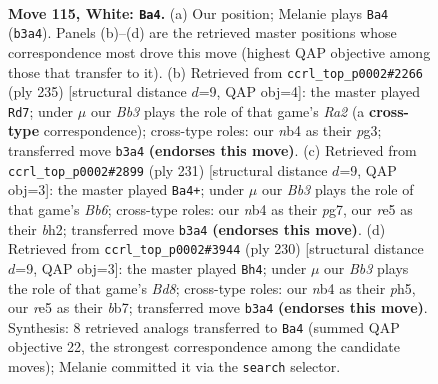 \documentclass[11pt]{article}
\begin{document}
\clearpage

\begin{figure}[p]\centering
\begin{subfigure}{0.46\textwidth}\centering
\resizebox{\linewidth}{!}{%
\newchessgame
\chessboard[
  setfen={8/8/8/4r1pk/1n6/1B4K1/8/8 w - - 14 115},
  showmover=false,
  pgfstyle=straightmove, color=movearrow, markmove={b3-a4}
]}
\caption{}
\end{subfigure}\hfill
\begin{subfigure}{0.46\textwidth}\centering
\resizebox{\linewidth}{!}{%
\newchessgame
\chessboard[
  setfen={6k1/r7/8/2R3PK/8/6P1/8/8 b - - 32 118},
  showmover=false,
  pgfstyle=straightmove, color=movearrow, markmove={a7-d7}
]}
\caption{}
\end{subfigure}
\\[4pt]
\begin{subfigure}{0.46\textwidth}\centering
\resizebox{\linewidth}{!}{%
\newchessgame
\chessboard[
  setfen={3k4/6P1/2KP4/8/8/1b6/7B/8 b - - 16 116},
  showmover=false,
  pgfstyle=straightmove, color=movearrow, markmove={b3-a4}
]}
\caption{}
\end{subfigure}\hfill
\begin{subfigure}{0.46\textwidth}\centering
\resizebox{\linewidth}{!}{%
\newchessgame
\chessboard[
  setfen={3B4/1b6/8/5k1p/5p2/8/5K2/8 w - - 78 116},
  showmover=false,
  pgfstyle=straightmove, color=movearrow, markmove={d8-h4}
]}
\caption{}
\end{subfigure}
\caption{\textbf{Move 115, White: \texttt{Ba4}.} (a) Our position; Melanie plays \texttt{Ba4} (\texttt{b3a4}). Panels (b)--(d) are the retrieved master positions whose correspondence most drove this move (highest QAP objective among those that transfer to it). (b) Retrieved from \texttt{ccrl\_top\_p0002\#2266} (ply 235) [structural distance $d$=9, QAP obj=4]: the master played \texttt{Rd7}; under $\mu$ our \emph{Bb3} plays the role of that game's \emph{Ra2} (a \textbf{cross-type} correspondence); cross-type roles: our \emph{n}b4 as their \emph{p}g3; transferred move \texttt{b3a4} \textbf{(endorses this move)}. (c) Retrieved from \texttt{ccrl\_top\_p0002\#2899} (ply 231) [structural distance $d$=9, QAP obj=3]: the master played \texttt{Ba4+}; under $\mu$ our \emph{Bb3} plays the role of that game's \emph{Bb6}; cross-type roles: our \emph{n}b4 as their \emph{p}g7, our \emph{r}e5 as their \emph{b}h2; transferred move \texttt{b3a4} \textbf{(endorses this move)}. (d) Retrieved from \texttt{ccrl\_top\_p0002\#3944} (ply 230) [structural distance $d$=9, QAP obj=3]: the master played \texttt{Bh4}; under $\mu$ our \emph{Bb3} plays the role of that game's \emph{Bd8}; cross-type roles: our \emph{n}b4 as their \emph{p}h5, our \emph{r}e5 as their \emph{b}b7; transferred move \texttt{b3a4} \textbf{(endorses this move)}. Synthesis: 8 retrieved analogs transferred to \texttt{Ba4} (summed QAP objective 22, the strongest correspondence among the candidate moves); Melanie committed it via the \texttt{search} selector.}
\label{fig:thought-m228}
\end{figure}
\end{document}
